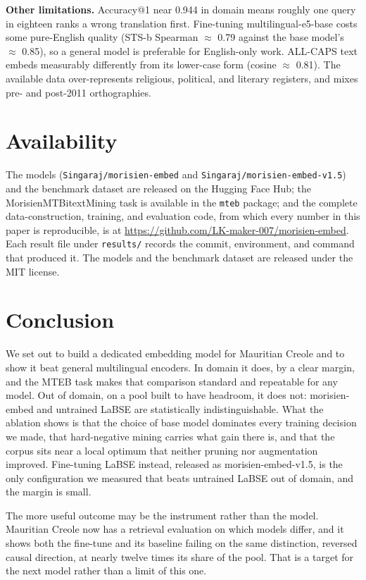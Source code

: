 \documentclass[11pt]{article}
\begin{document}
\textbf{Other limitations.} Accuracy@1 near 0.944 in domain means roughly one query in eighteen ranks
a wrong translation first. Fine-tuning multilingual-e5-base costs some pure-English quality (STS-b
Spearman $\approx$ 0.79 against the base model's $\approx$ 0.85), so a general model is preferable for
English-only work. ALL-CAPS text embeds measurably differently from its lower-case form (cosine
$\approx$ 0.81). The available data over-represents religious, political, and literary registers, and
mixes pre- and post-2011 orthographies.

\section{Availability}

The models (\texttt{Singaraj/morisien-embed} and \texttt{Singaraj/morisien-embed-v1.5}) and the
benchmark dataset are released on the Hugging Face Hub; the MorisienMTBitextMining task is available
in the \texttt{mteb} package; and the complete data-construction, training, and evaluation code, from
which every number in this paper is reproducible, is at
\url{https://github.com/LK-maker-007/morisien-embed}. Each result file under \texttt{results/}
records the commit, environment, and command that produced it. The models and the benchmark dataset
are released under the MIT license.

\section{Conclusion}

We set out to build a dedicated embedding model for Mauritian Creole and to show it beat general
multilingual encoders. In domain it does, by a clear margin, and the MTEB task makes that comparison
standard and repeatable for any model. Out of domain, on a pool built to have headroom, it does not:
morisien-embed and untrained LaBSE are statistically indistinguishable. What the ablation shows
is that the choice of base model dominates every training decision we made, that hard-negative mining
carries what gain there is, and that the corpus sits near a local optimum that neither pruning nor
augmentation improved. Fine-tuning LaBSE instead, released as morisien-embed-v1.5, is the only
configuration we measured that beats untrained LaBSE out of domain, and the margin is small.

The more useful outcome may be the instrument rather than the model. Mauritian Creole now has a
retrieval evaluation on which models differ, and it shows both the fine-tune and its baseline failing
on the same distinction, reversed causal direction, at nearly twelve times its share of the pool.
That is a target for the next model rather than a limit of this one.
\end{document}
